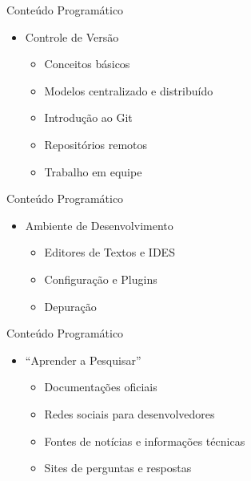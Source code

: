 \documentclass{beamer}
\begin{document}
\begin{frame}{Conteúdo Programático}\justifying
      \begin{itemize}
            \item Controle de Versão
            \begin{itemize}
                  \item Conceitos básicos
                  \item Modelos centralizado e distribuído
                  \item Introdução ao Git
                  \item Repositórios remotos
                  \item Trabalho em equipe
            \end{itemize}
           
      \end{itemize}
\end{frame}
\begin{frame}{Conteúdo Programático}\justifying
      \begin{itemize}
            \item Ambiente de Desenvolvimento
            \begin{itemize}
                  \item Editores de Textos e IDES
                  \item Configuração e Plugins
                  \item Depuração
            \end{itemize}
           
      \end{itemize}
\end{frame}
\begin{frame}{Conteúdo Programático}\justifying
      \begin{itemize}
            \item “Aprender a Pesquisar”
            \begin{itemize}
                  \item Documentações oficiais
                  \item Redes sociais para desenvolvedores
                  \item Fontes de notícias e informações técnicas
                  \item Sites de perguntas e respostas
            \end{itemize}
           
      \end{itemize}
\end{frame}
\end{document}
